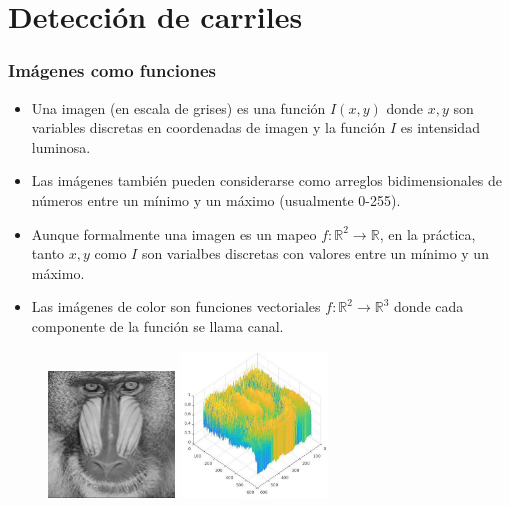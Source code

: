 \section{Detección de carriles}

\begin{frame}\frametitle{Imágenes como funciones}
  \begin{itemize}
  \item Una imagen (en escala de grises) es una función $I(x,y)$ donde $x,y$ son variables discretas en coordenadas de imagen y la función $I$ es intensidad luminosa.
    \item Las imágenes también pueden considerarse como arreglos bidimensionales de números entre un mínimo y un máximo (usualmente 0-255).
    \item Aunque formalmente una imagen es un mapeo $f:\mathbb{R}^2\rightarrow \mathbb{R}$, en la práctica, tanto $x,y$ como $I$ son varialbes discretas con valores entre un mínimo y un máximo.
    \item Las imágenes de color son funciones vectoriales $f:\mathbb{R}^2\rightarrow \mathbb{R}^3$ donde cada componente de la función se llama canal.
  \end{itemize}
  \begin{figure}
    \centering
    \includegraphics[width=0.3\textwidth]{Figuras/BaboonGrayscale.jpg}
    \includegraphics[width=0.35\textwidth]{Figuras/BaboonPlot.jpg}
  \end{figure}
\end{frame}

